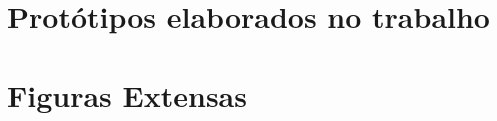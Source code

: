 \begin{anexosenv}

\partanexos

\chapter{Protótipos elaborados no trabalho}\label{anexos}

 
\cleardoublepage


\cleardoublepage


\cleardoublepage


\cleardoublepage


\cleardoublepage


\chapter{\nmu Figuras \nmu Extensas}\label{long_figures}



\end{anexosenv}
